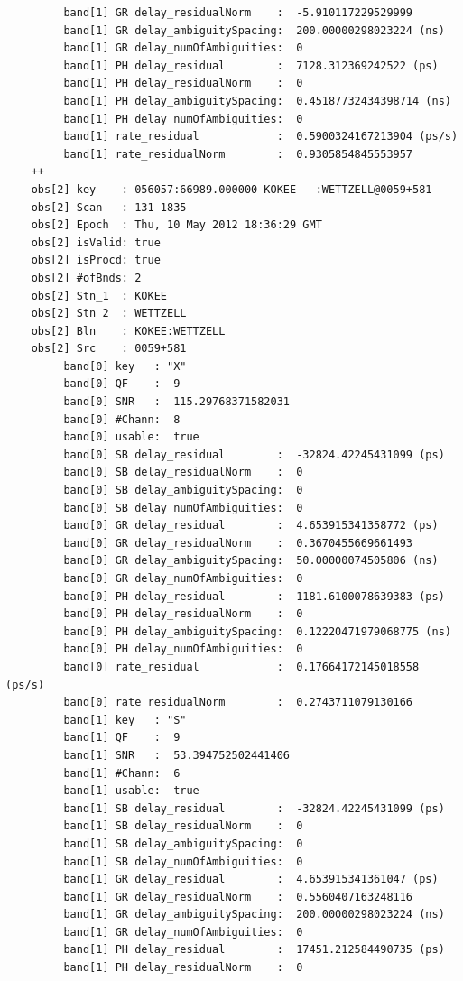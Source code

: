 \documentclass [10pt,letterpaper]{report}
\begin{document}
{{{\begin{verbatim}
         band[1] GR delay_residualNorm    :  -5.910117229529999
         band[1] GR delay_ambiguitySpacing:  200.00000298023224 (ns)
         band[1] GR delay_numOfAmbiguities:  0
         band[1] PH delay_residual        :  7128.312369242522 (ps)
         band[1] PH delay_residualNorm    :  0
         band[1] PH delay_ambiguitySpacing:  0.45187732434398714 (ns)
         band[1] PH delay_numOfAmbiguities:  0
         band[1] rate_residual            :  0.5900324167213904 (ps/s)
         band[1] rate_residualNorm        :  0.9305854845553957
    ++
    obs[2] key    : 056057:66989.000000-KOKEE   :WETTZELL@0059+581
    obs[2] Scan   : 131-1835  
    obs[2] Epoch  : Thu, 10 May 2012 18:36:29 GMT
    obs[2] isValid: true
    obs[2] isProcd: true
    obs[2] #ofBnds: 2
    obs[2] Stn_1  : KOKEE
    obs[2] Stn_2  : WETTZELL
    obs[2] Bln    : KOKEE:WETTZELL
    obs[2] Src    : 0059+581
         band[0] key   : "X"
         band[0] QF    :  9
         band[0] SNR   :  115.29768371582031
         band[0] #Chann:  8
         band[0] usable:  true
         band[0] SB delay_residual        :  -32824.42245431099 (ps)
         band[0] SB delay_residualNorm    :  0
         band[0] SB delay_ambiguitySpacing:  0
         band[0] SB delay_numOfAmbiguities:  0
         band[0] GR delay_residual        :  4.653915341358772 (ps)
         band[0] GR delay_residualNorm    :  0.3670455669661493
         band[0] GR delay_ambiguitySpacing:  50.00000074505806 (ns)
         band[0] GR delay_numOfAmbiguities:  0
         band[0] PH delay_residual        :  1181.6100078639383 (ps)
         band[0] PH delay_residualNorm    :  0
         band[0] PH delay_ambiguitySpacing:  0.12220471979068775 (ns)
         band[0] PH delay_numOfAmbiguities:  0
         band[0] rate_residual            :  0.17664172145018558 (ps/s)
         band[0] rate_residualNorm        :  0.2743711079130166
         band[1] key   : "S"
         band[1] QF    :  9
         band[1] SNR   :  53.394752502441406
         band[1] #Chann:  6
         band[1] usable:  true
         band[1] SB delay_residual        :  -32824.42245431099 (ps)
         band[1] SB delay_residualNorm    :  0
         band[1] SB delay_ambiguitySpacing:  0
         band[1] SB delay_numOfAmbiguities:  0
         band[1] GR delay_residual        :  4.653915341361047 (ps)
         band[1] GR delay_residualNorm    :  0.5560407163248116
         band[1] GR delay_ambiguitySpacing:  200.00000298023224 (ns)
         band[1] GR delay_numOfAmbiguities:  0
         band[1] PH delay_residual        :  17451.212584490735 (ps)
         band[1] PH delay_residualNorm    :  0

\end{verbatim}}}}
\end{document}
